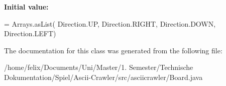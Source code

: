 {\bfseries Initial value\+:}
\begin{DoxyCode}
= Arrays.asList(
            Direction.UP, Direction.RIGHT, Direction.DOWN, Direction.LEFT)
\end{DoxyCode}


The documentation for this class was generated from the following file\+:\begin{DoxyCompactItemize}
\item 
/home/felix/\+Documents/\+Uni/\+Master/1. Semester/\+Technische Dokumentation/\+Spiel/\+Ascii-\/\+Crawler/src/asciicrawler/Board.\+java\end{DoxyCompactItemize}
